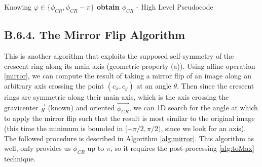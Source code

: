 \documentclass[11pt, a4paper, twoside]{article} %
\begin{document}
\begin{algorithm}
\caption{ Knowing {\bf $\varphi \in\{\phi_{CR},\phi_{CR}-\pi\}$ obtain $\phi_{CR}$} - High Level Pseudocode}\label{alg:toMax}

\end{algorithm}

\subsection*{B.6.4. The Mirror Flip Algorithm}
This is another algorithm that exploits the supposed self-symmetry of the crescent ring along its main axis (geometric property (a)). Using affine operation \eqref{mirror}, we can compute the result of taking a mirror flip of an image along an arbitrary axis crossing the point $(c_x,c_y)$ at an angle $\theta$. Then since the crescent rings are symmetric along their main axis, which is the axis crossing the gravicenter $\vec{g}$ (known) and oriented $\vec{\phi_{CR}}$, we can 1D search for the angle at which to apply the mirror flip such that the result is most similar to the original image (this time the minimum is bounded in $[-\pi/2,\pi/2)$, since we look for an axis). The followed procedure is described in Algorithm \ref{alg:mirror}. This algorithm as well, only provides us $\phi_{CR}$ up to $\pi$, so it requires the post-processing \ref{alg:toMax} technique.
\end{document}
